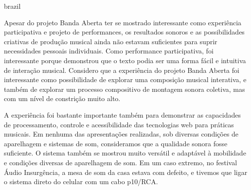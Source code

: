 \begin{otherlanguage*}{brazil}



Apesar do projeto Banda Aberta ter se mostrado interessante como experiência participativa e projeto de performances, os resultados sonoros e as possibilidades criativas de produção musical ainda não estavam suficientes para suprir necessidades pessoais individuais. Como performance participativa, foi interessante porque demonstrou que o texto podia ser uma forma fácil e intuitiva de interação musical. Considero que a experiência do projeto Banda Aberta foi interessante como possibilidade de explorar uma composição musical interativa, e também de explorar um processo compositivo de montagem sonora coletiva, mas com um nível de constrição muito alto. 

A experiência foi bastante importante também para demonstrar as capacidades de processamento, controle e acessibilidade das tecnologias web para práticas musicais. Em nenhuma das apresentações realizadas, sob diversas condições de aparelhagem e sistemas de som, consideramos que a qualidade sonora fosse suficiente. O sistema também se mostrou muito versátil e adaptável à mobilidade e condições diversas de aparelhagem de som. Em um caso extremo, no festival  Áudio Insurgência, a mesa de som da casa estava com defeito, e tivemos que ligar o sistema direto do celular com um cabo p10/RCA.


\end{otherlanguage*}
